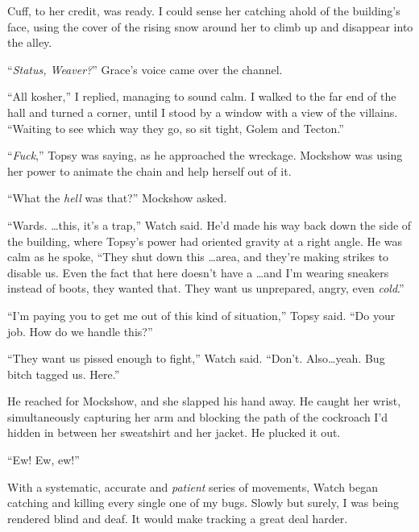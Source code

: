 Cuff, to her credit, was ready.  I could sense her catching ahold of the building's face, using the cover of the rising snow around her to climb up and disappear into the alley.



``\emph{Status, Weaver?}'' Grace's voice came over the channel.



``All kosher,'' I replied, managing to sound calm.  I walked to the far end of the hall and turned a corner, until I stood by a window with a view of the villains.  ``Waiting to see which way they go, so sit tight, Golem and Tecton.''



``\emph{Fuck},'' Topsy was saying, as he approached the wreckage.  Mockshow was using her power to animate the chain and help herself out of it.



``What the \emph{hell} was that?'' Mockshow asked.



``Wards.  \ldots this, it's a trap,'' Watch said.  He'd made his way back down the side of the building, where Topsy's power had oriented gravity at a right angle.  He was calm as he spoke, ``They shut down this \ldots area, and they're making \ldotscal strikes to disable us.  Even the fact that \ldotsshow here doesn't have a \ldots and I'm wearing sneakers instead of boots, they wanted that.  They want us unprepared, angry, even \emph{cold}.''



``I'm paying you to get me out of this kind of situation,'' Topsy said.  ``Do your job.  How do we handle this?''



``They want us pissed enough to fight,'' Watch said.  ``Don't.  Also\ldots yeah.  Bug bitch tagged us.  Here.''



He reached for Mockshow, and she slapped his hand away.  He caught her wrist, simultaneously capturing her arm and blocking the path of the cockroach I'd hidden in between her sweatshirt and her jacket.  He plucked it out.



``Ew!  Ew, ew!''



With a systematic, accurate and \emph{patient} series of movements, Watch began catching and killing every single one of my bugs.  Slowly but surely, I was being rendered blind and deaf.  It would make tracking a great deal harder.



